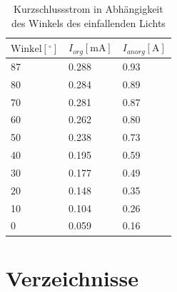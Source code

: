 \documentclass[slug=SZ, room=Hermann-Krone-Bau\,\ Labor\ 1.25,
supervisor=Martin\ Kroll, coursedate=14.\ 11.\ 2019]{../../Lab_Report_LaTeX/lab_report}
\begin{document}
\begin{table}[H]
        \centering
        \begin{tabular}{l|l|l}
                \toprule
                \(\text{Winkel} [^\circ]\) & \(I_{org} [\si{\milli\ampere}]\) &\(I_{anorg} [\si{\ampere}]\) \\
                \midrule
                87 & 0.288 & 0.93 \\
                80 & 0.284 & 0.89 \\
                70 & 0.281 & 0.87 \\
                60 & 0.262 & 0.80 \\
                50 & 0.238 & 0.73 \\
                40 & 0.195 & 0.59 \\
                30 & 0.177 & 0.49 \\
                20 & 0.148 & 0.35 \\
                10 & 0.104 & 0.26 \\
                0 & 0.059 & 0.16 \\
        \end{tabular}
        \caption{Kurzschlussstrom in Abhängigkeit des Winkels des einfallenden Lichts}
        \label{tab:messe}
\end{table}

\section{Verzeichnisse}

\label{sec:literatur}

\listoffigures

\listoftables

\printbibliography
\end{document}
